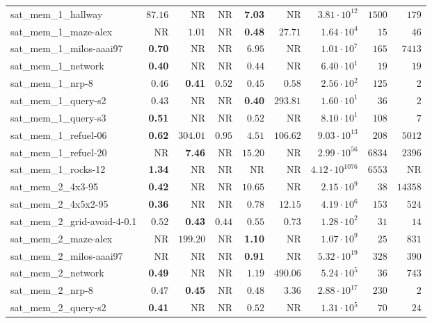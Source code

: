 \begin{tabular}{lrrrrrrrr}
sat\_mem\_1\_hallway & $87.16$ & NR & NR & \textbf{7.03} & NR & $3.81\cdot 10^{12}$ & $1500$ & $179$ \\
sat\_mem\_1\_maze-alex & NR & $1.01$ & NR & \textbf{0.48} & $27.71$ & $1.64\cdot 10^{4}$ & $15$ & $46$ \\
sat\_mem\_1\_milos-aaai97 & \textbf{0.70} & NR & NR & $6.95$ & NR & $1.01\cdot 10^{7}$ & $165$ & $7413$ \\
sat\_mem\_1\_network & \textbf{0.40} & NR & NR & $0.44$ & NR & $6.40\cdot 10^{1}$ & $19$ & $19$ \\
sat\_mem\_1\_nrp-8 & $0.46$ & \textbf{0.41} & $0.52$ & $0.45$ & $0.58$ & $2.56\cdot 10^{2}$ & $125$ & $2$ \\
sat\_mem\_1\_query-s2 & $0.43$ & NR & NR & \textbf{0.40} & $293.81$ & $1.60\cdot 10^{1}$ & $36$ & $2$ \\
sat\_mem\_1\_query-s3 & \textbf{0.51} & NR & NR & $0.52$ & NR & $8.10\cdot 10^{1}$ & $108$ & $7$ \\
sat\_mem\_1\_refuel-06 & \textbf{0.62} & $304.01$ & $0.95$ & $4.51$ & $106.62$ & $9.03\cdot 10^{13}$ & $208$ & $5012$ \\
sat\_mem\_1\_refuel-20 & NR & \textbf{7.46} & NR & $15.20$ & NR & $2.99\cdot 10^{56}$ & $6834$ & $2396$ \\
sat\_mem\_1\_rocks-12 & \textbf{1.34} & NR & NR & NR & NR & $4.12\cdot 10^{1076}$ & $6553$ & NR \\
sat\_mem\_2\_4x3-95 & \textbf{0.42} & NR & NR & $10.65$ & NR & $2.15\cdot 10^{9}$ & $38$ & $14358$ \\
sat\_mem\_2\_4x5x2-95 & \textbf{0.36} & NR & NR & $0.78$ & $12.15$ & $4.19\cdot 10^{6}$ & $153$ & $524$ \\
sat\_mem\_2\_grid-avoid-4-0.1 & $0.52$ & \textbf{0.43} & $0.44$ & $0.55$ & $0.73$ & $1.28\cdot 10^{2}$ & $31$ & $14$ \\
sat\_mem\_2\_maze-alex & NR & $199.20$ & NR & \textbf{1.10} & NR & $1.07\cdot 10^{9}$ & $25$ & $831$ \\
sat\_mem\_2\_milos-aaai97 & NR & NR & NR & \textbf{0.91} & NR & $5.32\cdot 10^{19}$ & $328$ & $390$ \\
sat\_mem\_2\_network & \textbf{0.49} & NR & NR & $1.19$ & $490.06$ & $5.24\cdot 10^{5}$ & $36$ & $743$ \\
sat\_mem\_2\_nrp-8 & $0.47$ & \textbf{0.45} & NR & $0.48$ & $3.36$ & $2.88\cdot 10^{17}$ & $230$ & $2$ \\
sat\_mem\_2\_query-s2 & \textbf{0.41} & NR & NR & $0.52$ & NR & $1.31\cdot 10^{5}$ & $70$ & $24$ \\

\end{tabular}

